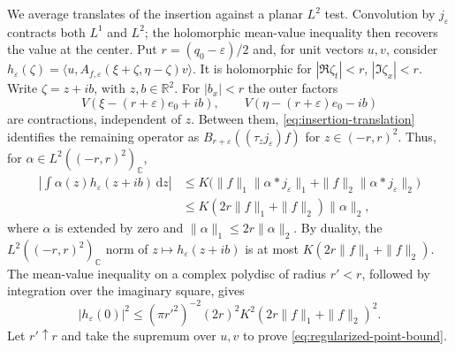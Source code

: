 \documentclass[11pt, letterpaper, reqno]{amsart}
\theoremstyle{definition}
\theoremstyle{remark}
\newcommand{\bbC}{\mathbb{C}}
\newcommand{\bbR}{\mathbb{R}}
\newcommand{\dd}{\,\mathrm{d}}
\begin{document}
We average translates of the insertion against a planar $L^2$ test.
Convolution by $j_\varepsilon$ contracts both $L^1$ and $L^2$;
the holomorphic mean-value inequality then recovers the value at
the center. Put $r=(q_0-\varepsilon)/2$ and, for unit vectors $u,v$, consider
$h_\varepsilon(\zeta)=
\langle u,A_{f,\varepsilon}(\xi+\zeta,\eta-\zeta)v\rangle$.
It is holomorphic for $|\Re\zeta_t|<r$, $|\Im\zeta_x|<r$.
Write $\zeta=z+ib$, with $z,b\in\bbR^2$. For $|b_x|<r$ the outer
factors
\begin{equation}
 V(\xi-(r+\varepsilon)e_0+ib),\qquad
 V(\eta-(r+\varepsilon)e_0-ib)
\end{equation}
are contractions, independent of $z$. Between them,
\eqref{eq:insertion-translation} identifies the remaining operator as
$B_{r+\varepsilon}((\tau_zj_\varepsilon)f)$ for
$z\in(-r,r)^2$. Thus, for $\alpha\in L^2((-r,r)^2)_\bbC$,
\begin{equation}
\begin{split}
 \left|\int\alpha(z)h_\varepsilon(z+ib)\dd z\right|
 &\leq K\bigl(\|f\|_1\|\alpha*j_\varepsilon\|_1
              +\|f\|_2\|\alpha*j_\varepsilon\|_2\bigr)\\
 &\leq K(2r\|f\|_1+\|f\|_2)\|\alpha\|_2,
\end{split}
\end{equation}
where $\alpha$ is extended by zero and $\|\alpha\|_1\leq2r\|\alpha\|_2$.
By duality, the $L^2((-r,r)^2)_\bbC$ norm of
$z\mapsto h_\varepsilon(z+ib)$ is at most $K(2r\|f\|_1+\|f\|_2)$.
The mean-value inequality on a complex polydisc
of radius $r'<r$, followed by integration over the imaginary square,
gives
\begin{equation}
 |h_\varepsilon(0)|^2\leq(\pi r'^2)^{-2}(2r)^2K^2
                    (2r\|f\|_1+\|f\|_2)^2.
\end{equation}
Let $r'\uparrow r$ and take the supremum over $u,v$ to prove
\eqref{eq:regularized-point-bound}.
\end{document}
